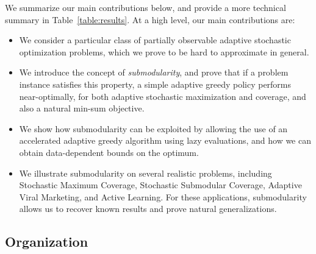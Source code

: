 We summarize our main contributions below, and provide a more
technical summary in  Table~\ref{table:results}.
At a high level, our main contributions are: 
\begin{itemize}
\item We consider a particular class of partially observable adaptive stochastic optimization problems, which we prove to be hard to approximate in general.
\item We introduce the concept of \emph{\term submodularity}, and
  prove that if a problem instance satisfies this property, a simple
  adaptive greedy policy performs near-optimally, for both adaptive
  stochastic maximization and coverage, and also a natural min-sum objective.
\item We show how \term submodularity can be exploited by allowing the
  use of an accelerated adaptive greedy algorithm using lazy
  evaluations, and how we can obtain data-dependent bounds on the optimum.
\item We illustrate \term submodularity on several realistic problems,
  including Stochastic Maximum Coverage, Stochastic Submodular Coverage,
  Adaptive Viral Marketing, and 
  Active Learning.  For these applications, \term submodularity allows
  us to recover known results and prove natural generalizations.
\end{itemize}

%
%


\subsection{Organization} %

